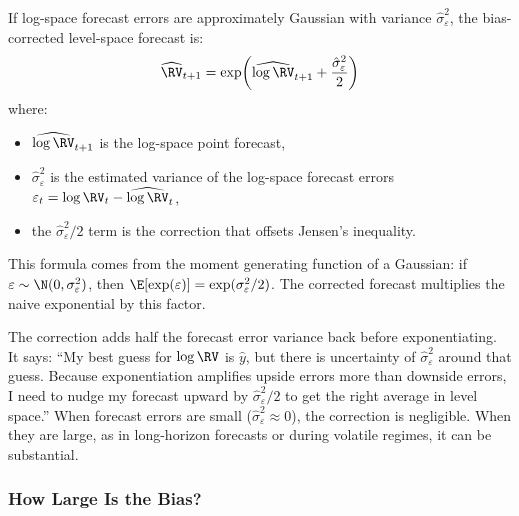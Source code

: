 If log-space forecast errors are approximately Gaussian with variance $\hat{\sigma}^2_\varepsilon$, the bias-corrected level-space forecast is:
\begin{equation}
\label{eq:retransform}
\widehat{\RV}_{t+1} = \exp\!\left(\widehat{\log \RV}_{t+1} + \frac{\hat{\sigma}^2_\varepsilon}{2}\right)
\end{equation}
where:
\begin{itemize}[nosep]
  \item $\widehat{\log \RV}_{t+1}$ is the log-space point forecast,
  \item $\hat{\sigma}^2_\varepsilon$ is the estimated variance of the log-space forecast errors $\varepsilon_t = \log \RV_t - \widehat{\log \RV}_t$,
  \item the $\hat{\sigma}^2_\varepsilon / 2$ term is the correction that offsets Jensen's inequality.
\end{itemize}

This formula comes from the moment generating function of a Gaussian: if $\varepsilon \sim \N(0, \sigma^2_\varepsilon)$, then $\E[\exp(\varepsilon)] = \exp(\sigma^2_\varepsilon / 2)$.
The corrected forecast multiplies the naive exponential by this factor.

\begin{intuition}
The correction adds half the forecast error variance back before exponentiating.
It says: ``My best guess for $\log \RV$ is $\hat{y}$, but there is uncertainty of $\hat{\sigma}^2_\varepsilon$ around that guess.
Because exponentiation amplifies upside errors more than downside errors, I need to nudge my forecast upward by $\hat{\sigma}^2_\varepsilon / 2$ to get the right average in level space.''
When forecast errors are small ($\hat{\sigma}^2_\varepsilon \approx 0$), the correction is negligible.
When they are large, as in long-horizon forecasts or during volatile regimes, it can be substantial.
\end{intuition}

\subsubsection{How Large Is the Bias?}

